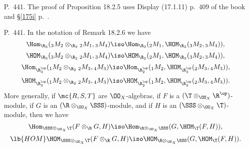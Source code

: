\documentclass[12pt]{article}
\theoremstyle{remark}
\theoremstyle{definition}
\begin{document}
% 

\begin{s}
P.~441. The proof of Proposition 18.2.5 uses Display (17.1.11) p.~409 of the book and \S\ref{175i} p.~. 
\end{s} 

% 

\begin{s} 
P.~441. In the notation of Remark 18.2.6 we have 
$$
\Hom_{\R_3}({}_3M_2\otimes_{\R_2}{}_2M_1,{}_3M_4)\iso
\Hom_{\R_2}({}_2M_1,\HOM_{\R_3}({}_3M_2,{}_3M_4)),
$$
$$
\HOM_{\R_3}({}_3M_2\otimes_{\R_2}{}_2M_1,{}_3M_4)\iso
\HOM_{\R_2}({}_2M_1,\HOM_{\R_3}({}_3M_2,{}_3M_4)),
$$ 
$$
\Hom_{\R_3^{\op}}({}_1M_2\otimes_{\R_2}{}_2M_3,{}_4M_3)\iso
\Hom_{\R_2^{\op}}({}_1M_2,\HOM_{\R_3^{\op}}({}_2M_3,{}_4M_3)),
$$ 
$$
\HOM_{\R_3^{\op}}({}_1M_2\otimes_{\R_2}{}_2M_3,{}_4M_3)\iso
\HOM_{\R_2^{\op}}({}_1M_2,\HOM_{\R_3^{\op}}({}_2M_3,{}_4M_3)).
$$ 
More generally, if $\mc{R,S,T}$ are $\OO_X$-algebras, if $F$ is a $(\T\otimes_{\OO_X}\R^{\op})$-module, if $G$ is an $(\R\otimes_{\OO_X}\SSS)$-module, and if $H$ is an $(\SSS\otimes_{\OO_X}\T)$-module, then we have 
$$ 
\Hom_{\SSS\otimes_{\OO_X}\T}(F\otimes_\R G,H)\iso
\Hom_{\R\otimes_{\OO_X}\SSS}(G,\HOM_{\T}(F,H)), 
$$ 
\begin{equation}\lb{HOM}
\HOM_{\SSS\otimes_{\OO_X}\T}(F\otimes_\R G,H)\iso
\HOM_{\R\otimes_{\OO_X}\SSS}(G,\HOM_\T(F,H)). 
\end{equation}
\end{s} 

%
\end{document}
